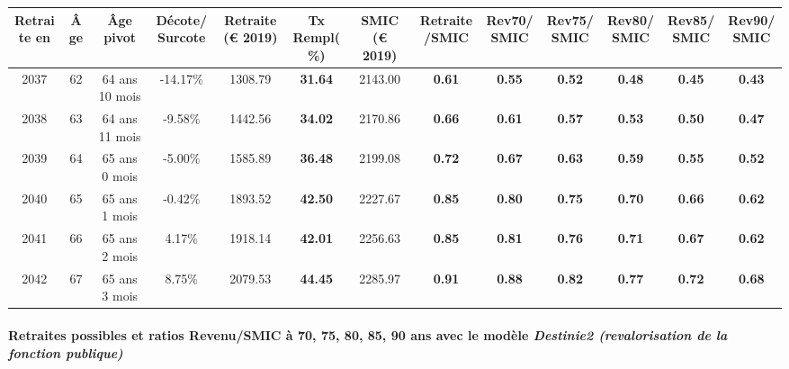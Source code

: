 { \scriptsize \begin{center} 
\begin{tabular}[htb]{|c|c||c|c||c|c||c||c|c|c|c|c|c|} 
\hline 
 Retraite en &  Âge &  Âge pivot &  Décote/Surcote &  Retraite (\euro{} 2019) &  Tx Rempl(\%) &  SMIC (\euro{} 2019) &  Retraite/SMIC &  Rev70/SMIC &  Rev75/SMIC &  Rev80/SMIC &  Rev85/SMIC &  Rev90/SMIC \\ 
\hline \hline 
 2037 &  62 &  64 ans 10 mois &  -14.17\% &  1308.79 &  {\bf 31.64} &  2143.00 &  {\bf {\color{red} 0.61}} &  {\bf {\color{red} 0.55}} &  {\bf {\color{red} 0.52}} &  {\bf {\color{red} 0.48}} &  {\bf {\color{red} 0.45}} &  {\bf {\color{red} 0.43}} \\ 
\hline 
 2038 &  63 &  64 ans 11 mois &  -9.58\% &  1442.56 &  {\bf 34.02} &  2170.86 &  {\bf {\color{red} 0.66}} &  {\bf {\color{red} 0.61}} &  {\bf {\color{red} 0.57}} &  {\bf {\color{red} 0.53}} &  {\bf {\color{red} 0.50}} &  {\bf {\color{red} 0.47}} \\ 
\hline 
 2039 &  64 &  65 ans 0 mois &  -5.00\% &  1585.89 &  {\bf 36.48} &  2199.08 &  {\bf {\color{red} 0.72}} &  {\bf {\color{red} 0.67}} &  {\bf {\color{red} 0.63}} &  {\bf {\color{red} 0.59}} &  {\bf {\color{red} 0.55}} &  {\bf {\color{red} 0.52}} \\ 
\hline 
 2040 &  65 &  65 ans 1 mois &  -0.42\% &  1893.52 &  {\bf 42.50} &  2227.67 &  {\bf {\color{red} 0.85}} &  {\bf {\color{red} 0.80}} &  {\bf {\color{red} 0.75}} &  {\bf {\color{red} 0.70}} &  {\bf {\color{red} 0.66}} &  {\bf {\color{red} 0.62}} \\ 
\hline 
 2041 &  66 &  65 ans 2 mois &  4.17\% &  1918.14 &  {\bf 42.01} &  2256.63 &  {\bf {\color{red} 0.85}} &  {\bf {\color{red} 0.81}} &  {\bf {\color{red} 0.76}} &  {\bf {\color{red} 0.71}} &  {\bf {\color{red} 0.67}} &  {\bf {\color{red} 0.62}} \\ 
\hline 
 2042 &  67 &  65 ans 3 mois &  8.75\% &  2079.53 &  {\bf 44.45} &  2285.97 &  {\bf {\color{red} 0.91}} &  {\bf {\color{red} 0.88}} &  {\bf {\color{red} 0.82}} &  {\bf {\color{red} 0.77}} &  {\bf {\color{red} 0.72}} &  {\bf {\color{red} 0.68}} \\ 
\hline 
\hline 
\end{tabular} 
\end{center} } 
\paragraph{Retraites possibles et ratios Revenu/SMIC à 70, 75, 80, 85, 90 ans avec le modèle \emph{Destinie2 (revalorisation de la fonction publique)}}  
 
